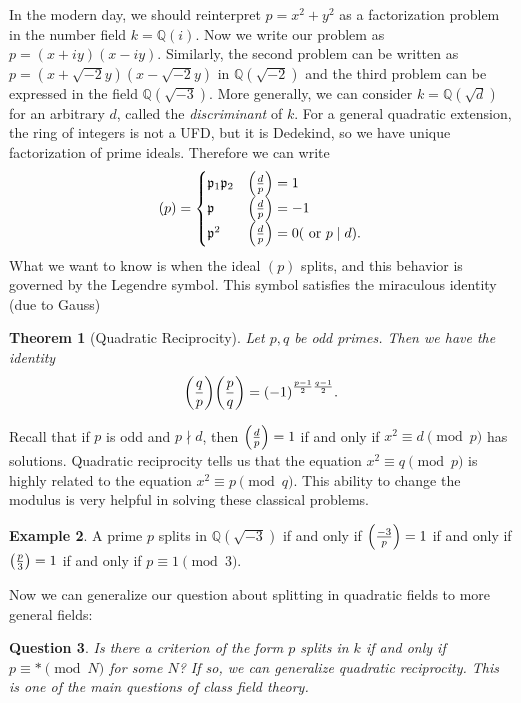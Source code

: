 \documentclass[leqno, openany]{memoir}
\newtheorem{thm}{Theorem}[section]
\newtheorem{quest}[thm]{Question}
\theoremstyle{definition}
\newtheorem{exm}[thm]{Example}
\theoremstyle{remark}
\theoremstyle{plain}
\theoremstyle{definition}
\theoremstyle{remark}
\newcommand{\Q}{\mathbb{Q}}
\newcommand{\mf}[1]{\mathfrak{#1}}
\begin{document}
In the modern day, we should reinterpret $p = x^2 + y^2$ as a factorization problem in the number field $k = \Q(i)$. Now we write our problem as $p = (x+iy)(x-iy)$. Similarly, the second problem can be written as $p = (x + \sqrt{-2} y)(x - \sqrt{-2} y)$ in $\Q(\sqrt{-2})$ and the third problem can be expressed in the field $\Q(\sqrt{-3})$. More generally, we can consider $k = \Q(\sqrt{d})$ for an arbitrary $d$, called the \textit{discriminant} of $k$. For a general quadratic extension, the ring of integers is not a UFD, but it is Dedekind, so we have unique factorization of prime ideals. Therefore we can write
\[ (p) = \begin{cases}
    \mf{p}_1 \mf{p}_2 & \qty(\frac{d}{p}) = 1 \\
    \mf{p} & \qty(\frac{d}{p}) = -1 \\
    \mf{p}^2 & \qty(\frac{d}{p}) = 0 (\text{ or } p \mid d).
\end{cases} \]
What we want to know is when the ideal $(p)$ splits, and this behavior is governed by the Legendre symbol. This symbol satisfies the miraculous identity (due to Gauss)

\begin{thm}[Quadratic Reciprocity]
    Let $p,q$ be odd primes. Then we have the identity
    \[ \qty(\frac{q}{p}) \qty(\frac{p}{q}) = {(-1)}^{\frac{p-1}{2} \frac{q-1}{2}}. \]
\end{thm}

Recall that if $p$ is odd and $p \nmid d$, then $\qty(\frac{d}{p}) = 1$ if and only if $x^2 \equiv d \pmod p$ has solutions. Quadratic reciprocity tells us that the equation $x^2 \equiv q \pmod p$ is highly related to the equation $x^2 \equiv p \pmod q$. This ability to change the modulus is very helpful in solving these classical problems.

\begin{exm}
    A prime $p$ splits in $\Q(\sqrt{-3})$ if and only if $\qty(\frac{-3}{p}) = 1$ if and only if $\qty(\frac{p}{3}) = 1$ if and only if $p \equiv 1 \pmod 3$.
\end{exm}

Now we can generalize our question about splitting in quadratic fields to more general fields:

\begin{quest}
    Is there a criterion of the form $p$ splits in $k$ if and only if $p \equiv * \pmod N$ for some $N$? If so, we can generalize quadratic reciprocity. This is one of the main questions of class field theory.
\end{quest}
\end{document}
